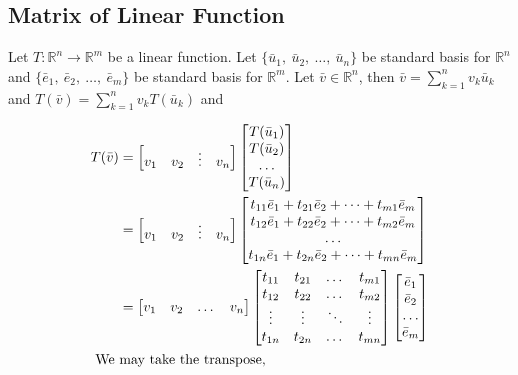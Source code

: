 \subsection{Matrix of Linear Function}
Let $T : \mathbb{R}^n \to \mathbb{R}^m$ be a linear function.
Let $\{\bar{u}_1,\ \bar{u}_2,\ \dots,\ \bar{u}_n\}$ be standard basis for $\mathbb{R}^n$ and  $\{\bar{e}_1,\ \bar{e}_2,\ \dots,\ \bar{e}_m\}$ be standard basis for $\mathbb{R}^m$.
Let $\bar{v} \in \mathbb{R}^n$, then $\bar{v} = \sum_{k=1}^n v_k\bar{u}_k$ and $T(\bar{v}) = \sum_{k=1}^n v_k T(\bar{u}_k)$ and
\begin{commentary}
\begin{align*}
	T(\bar{v}) & =  \begin{bmatrix} v_1 & v_2 & \vdots & v_n  \end{bmatrix} \begin{bmatrix} T(\bar{u}_1) \\ T(\bar{u}_2) \\ \dots \\ T(\bar{u}_n) \end{bmatrix} \\
	& =  \begin{bmatrix} v_1 & v_2 & \vdots & v_n  \end{bmatrix}\begin{bmatrix} t_{11}\bar{e}_1+t_{21}\bar{e}_2+\dotsb+t_{m1}\bar{e}_m \\ t_{12}\bar{e}_1+t_{22}\bar{e}_2+\dotsb+t_{m2}\bar{e}_m \\ \dots \\ t_{1n}\bar{e}_1+t_{2n}\bar{e}_2+\dotsb+t_{mn}\bar{e}_m \end{bmatrix} \\
	& = \begin{bmatrix} v_1 & v_2 & \dots & v_n  \end{bmatrix} \begin{bmatrix} t_{11} & t_{21} & \dots & t_{m1} \\ t_{12} & t_{22} & \dots & t_{m2} \\ \vdots & \vdots & \ddots & \vdots \\ t_{1n} & t_{2n} & \dots & t_{mn} \end{bmatrix} \begin{bmatrix} \bar{e}_1 \\ \bar{e}_2 \\ \dots \\ \bar{e}_m \end{bmatrix} \\
	\intertext{ We may take the transpose,}

\end{align*}
\end{commentary}
